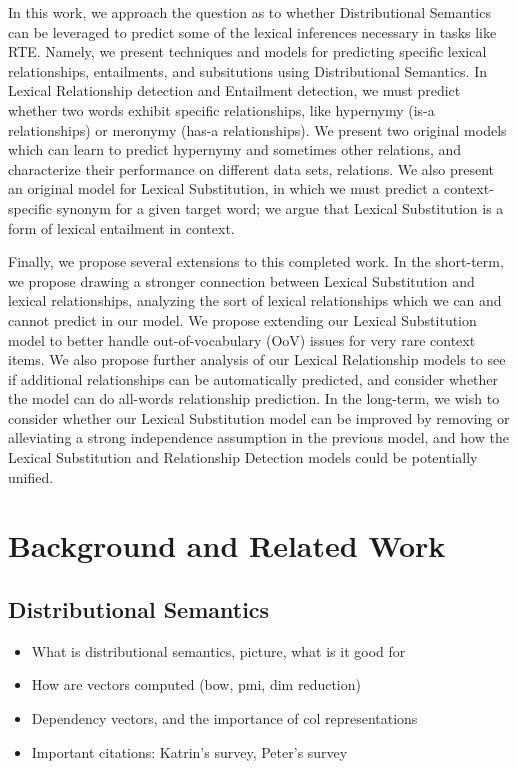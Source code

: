 \documentclass[letterpaper]{article}
\begin{document}
In this work, we approach the question as to whether Distributional Semantics
can be leveraged to predict some of the lexical inferences necessary in tasks
like RTE. Namely, we present techniques and models for predicting specific
lexical relationships, entailments, and subsitutions using Distributional
Semantics. In Lexical Relationship detection and Entailment detection, we must
predict whether two words exhibit specific relationships, like hypernymy (is-a
relationships) or meronymy (has-a relationships). We present two original
models which can learn to predict hypernymy and sometimes other relations,
and characterize their performance on different data sets, relations. We also
present an original model for Lexical Substitution, in which we must predict a
context-specific synonym for a given target word; we argue that Lexical
Substitution is a form of lexical entailment in context.

Finally, we propose several extensions to this completed work. In the
short-term, we propose drawing a stronger connection between Lexical
Substitution and lexical relationships, analyzing the sort of lexical
relationships which we can and cannot predict in our model. We propose
extending our Lexical Substitution model to better handle out-of-vocabulary
(OoV) issues for very rare context items. We also propose further analysis of
our Lexical Relationship models to see if additional relationships can be
automatically predicted, and consider whether the model can do all-words
relationship prediction.  In the long-term, we wish to consider whether our
Lexical Substitution model can be improved by removing or alleviating a strong
independence assumption in the previous model, and how the Lexical Substitution
and Relationship Detection models could be potentially unified.

\section{Background and Related Work}

\subsection{Distributional Semantics}
\begin{itemize}
  \item What is distributional semantics, picture, what is it good for
  \item How are vectors computed (bow, pmi, dim reduction)
  \item Dependency vectors, and the importance of col representations
  \item Important citations: Katrin's survey, Peter's survey
\end{itemize}
\end{document}
